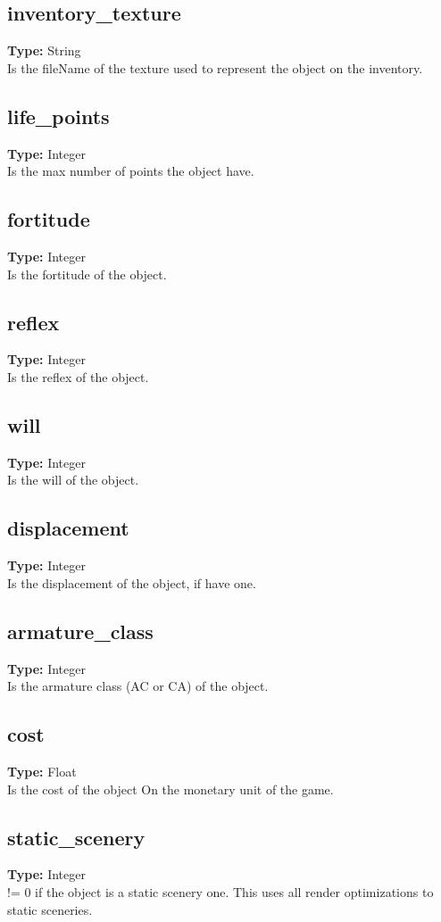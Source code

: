\documentclass[letterpaper,12pt]{article}
\begin{document}
\subsection{inventory\_texture}
{\bf Type:} String\\
Is the fileName of the texture used to represent the object on the inventory.

\subsection{life\_points}
{\bf Type:} Integer\\
Is the max number of points the object have.

\subsection{fortitude}
{\bf Type:} Integer\\
Is the fortitude of the object.

\subsection{reflex}
{\bf Type:} Integer\\
Is the reflex of the object.

\subsection{will}
{\bf Type:} Integer\\
Is the will of the object.

\subsection{displacement}
{\bf Type:} Integer\\
Is the displacement of the object, if have one.

\subsection{armature\_class}
{\bf Type:} Integer\\
Is the armature class (AC or CA) of the object.

\subsection{cost}
{\bf Type:} Float\\
Is the cost of the object On the monetary unit of the game.

\subsection{static\_scenery}
{\bf Type:} Integer\\
!= 0 if the object is a static scenery one. This uses all render optimizations
to static sceneries. 
\end{document}
